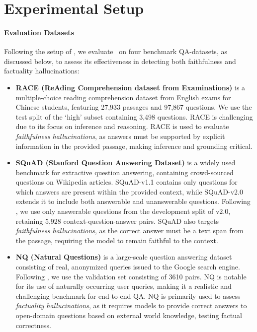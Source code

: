 

\section{Experimental Setup}
\label{sec:experiments}

\paragraph{\textbf{Evaluation Datasets}}
Following the setup of \citet{hallucinations-leaderboard}, we evaluate \method~on four benchmark QA-datasets, as discussed below, to assess its effectiveness in detecting both faithfulness and factuality hallucinations:
\begin{itemize}
    \item[\textbf{(i)}] \textbf{RACE (ReAding Comprehension dataset from Examinations)} \citep{lai-etal-2017-race} is a multiple-choice reading comprehension dataset from English exams for Chinese students, featuring 27,933 passages and 97,867 questions. We use the test split of the `high' subset containing 3,498 questions. RACE is challenging due to its focus on inference and reasoning. RACE is used to evaluate \textit{faithfulness hallucinations}, as answers must be supported by explicit information in the provided passage, making inference and grounding critical.
    
    \item[\textbf{(ii)}] \textbf{SQuAD (Stanford Question Answering Dataset)} \citep{rajpurkar2016squad100000questionsmachine} is a widely used benchmark for extractive question answering, containing crowd-sourced questions on Wikipedia articles. SQuAD-v1.1 contains only questions for which answers are present within the provided context, while SQuAD-v2.0 extends it to include both answerable and unanswerable questions. Following \citet{chen_inside:_2024}, we use only answerable questions from the development split of $\text{v}2.0$, retaining 5,928 context-question-answer pairs. SQuAD also targets \textit{faithfulness hallucinations}, as the correct answer must be a text span from the passage, requiring the model to remain faithful to the context.

    \item[\textbf{(iii)}] \textbf{NQ (Natural Questions)} \citep{kwiatkowski-etal-2019-natural} is a large-scale question answering dataset consisting of real, anonymized queries issued to the Google search engine. Following \citet{lin2024generatingconfidenceuncertaintyquantification}, we use the validation set consisting of 3610 pairs. NQ is notable for its use of naturally occurring user queries, making it a realistic and challenging benchmark for end-to-end QA. NQ is primarily used to assess \textit{factuality hallucinations}, as it requires models to provide correct answers to open-domain questions based on external world knowledge, testing factual correctness.


\end{itemize}
